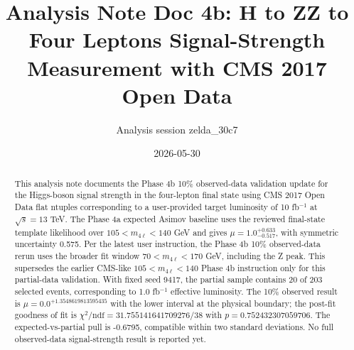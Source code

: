 \documentclass[11pt]{article}
\title{Analysis Note Doc 4b: H to ZZ to Four Leptons Signal-Strength Measurement with CMS 2017 Open Data}
\author{Analysis session zelda\_30c7}
\date{2026-05-30}
\begin{document}
\maketitle
\begin{abstract}
This analysis note documents the Phase 4b 10\% observed-data validation update for the Higgs-boson signal strength in the four-lepton final state using CMS 2017 Open Data flat ntuples corresponding to a user-provided target luminosity of 10 fb$^{-1}$ at $\sqrt{s}=13$ TeV.
The Phase 4a expected Asimov baseline uses the reviewed final-state template likelihood over $105 < m_{4\ell} < 140$ GeV and gives $\mu=1.0^{+0.633}_{-0.517}$, with symmetric uncertainty 0.575.
Per the latest user instruction, the Phase 4b 10\% observed-data rerun uses the broader fit window $70 < m_{4\ell} < 170$ GeV, including the Z peak.
This supersedes the earlier CMS-like $105 < m_{4\ell} < 140$ Phase 4b instruction only for this partial-data validation.
With fixed seed 9417, the partial sample contains 20 of 203 selected events, corresponding to 1.0 fb$^{-1}$ effective luminosity. The 10\% observed result is $\mu=0.0^{+1.3548619813595435}$ with the lower interval at the physical boundary; the post-fit goodness of fit is $\chi^2/\mathrm{ndf}=31.755141641709276/38$ with $p=0.752432307059706$. The expected-vs-partial pull is -0.6795, compatible within two standard deviations. No full observed-data signal-strength result is reported yet.
\end{abstract}
\tableofcontents
\clearpage
\end{document}
